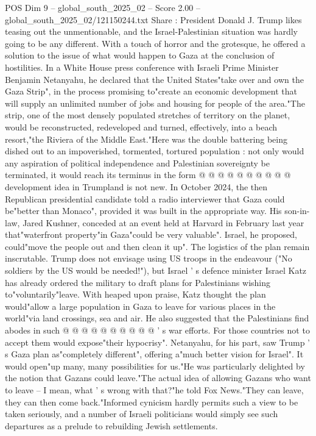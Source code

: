 \begin{textsample}{POS Dim 9 – global\_south\_2025\_02 – Score 2.00 – global\_south\_2025\_02/121150244.txt}  \label{ex:f9_pos_259}
Share : President Donald J.
Trump likes teasing out the unmentionable, and the Israel-Palestinian situation was hardly going to be any different.
With a touch of horror and the grotesque, he offered a solution to the issue of what would happen to Gaza at the conclusion of hostilities.
In a White House press conference with Israeli Prime Minister Benjamin Netanyahu, he declared that the United States"take over and own the Gaza Strip", in the process promising to"create an economic development that will supply an unlimited number of jobs and housing for people of the area."The strip, one of the most densely populated stretches of territory on the planet, would be reconstructed, redeveloped and turned, effectively, into a beach resort,"the Riviera of the Middle East."Here was the double battering being dished out to an impoverished, tormented, tortured population : not only would any aspiration of political independence and Palestinian sovereignty be terminated, it would reach its terminus in the form @ @ @ @ @ @ @ @ @ @ development idea in Trumpland is not new.
In October 2024, the then Republican presidential candidate told a radio interviewer that Gaza could be"better than Monaco", provided it was built in the appropriate way.
His son-in-law, Jared Kushner, conceded at an event held at Harvard in February last year that"waterfront property"in Gaza"could be very valuable".
Israel, he proposed, could"move the people out and then clean it up".
The logistics of the plan remain inscrutable.
Trump does not envisage using US troops in the endeavour ("No soldiers by the US would be needed!"), but Israel ' s defence minister Israel Katz has already ordered the military to draft plans for Palestinians wishing to"voluntarily"leave.
With heaped upon praise, Katz thought the plan would"allow a large population in Gaza to leave for various places in the world"via land crossings, sea and air.
He also suggested that the Palestinians find abodes in such @ @ @ @ @ @ @ @ @ @ ' s war efforts.
For those countries not to accept them would expose"their hypocrisy".
Netanyahu, for his part, saw Trump ' s Gaza plan as"completely different", offering a"much better vision for Israel".
It would open"up many, many possibilities for us."He was particularly delighted by the notion that Gazans could leave."The actual idea of allowing Gazans who want to leave -- I mean, what ' s wrong with that?"he told Fox News."They can leave, they can then come back."Informed cynicism hardly permits such a view to be taken seriously, and a number of Israeli politicians would simply see such departures as a prelude to rebuilding Jewish settlements.

\end{textsample}
